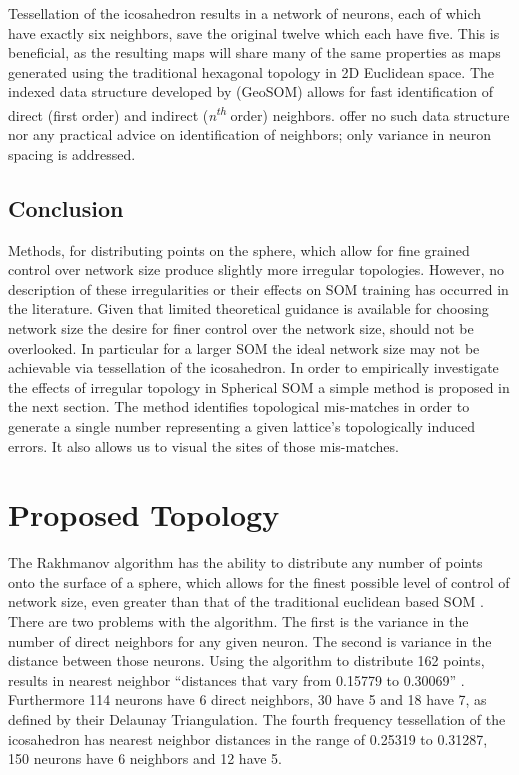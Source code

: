 \documentclass[12pt]{article}
\begin{document}
Tessellation of the icosahedron results in a network of neurons, each of which
have exactly six neighbors, save the original twelve which each have five.
This is beneficial, as the resulting maps will share many of the same
properties as maps generated using the traditional hexagonal topology in 2D
Euclidean space. The indexed data structure developed by
\citeauthor{Wu:2006lr} (GeoSOM) allows for fast identification of direct
(first order) and indirect (\textit{n\textsuperscript{th}} order) neighbors.
\cite{Nishio:2006fk} offer no such data structure nor any practical advice on
identification of neighbors; only variance in neuron spacing is addressed.

\subsection{Conclusion}
Methods, for distributing points on the sphere, which allow for fine grained 
control over network size produce slightly more irregular topologies.  However,
no description of these irregularities or their effects on SOM training has occurred in the
literature. Given that limited theoretical guidance is available for choosing network size the
desire for finer control over the network size, should not be overlooked. In
particular for a larger SOM the ideal network size may not be achievable via
tessellation of the icosahedron. In order to empirically investigate the effects of irregular 
topology in Spherical SOM a simple method is proposed in the next section.  The method
identifies topological mis-matches in order to generate a single number representing a
given lattice's topologically induced errors.  It also allows us to visual the sites of those mis-matches.

\section{Proposed Topology}

The Rakhmanov algorithm has the ability to distribute any number of points
onto the surface of a sphere, which allows for the finest possible level of
control of network size, even greater than that of the traditional euclidean
based SOM \citep{Rakhmanov94}.  There are two problems with the \citeauthor{Rakhmanov94}
algorithm. The first is the variance in the number of direct neighbors for any
given neuron.  The second is variance in the distance between those neurons.
Using the algorithm to distribute 162 points, results in nearest neighbor
``distances that vary from 0.15779 to 0.30069'' \cite[pg 3]{wu2005}.
Furthermore 114 neurons have 6 direct neighbors, 30 have 5 and 18 have 7, as
defined by their Delaunay Triangulation.  The fourth frequency tessellation of
the icosahedron has nearest neighbor distances in the range of 0.25319 to
0.31287, 150 neurons have 6 neighbors and 12 have 5.
\end{document}
